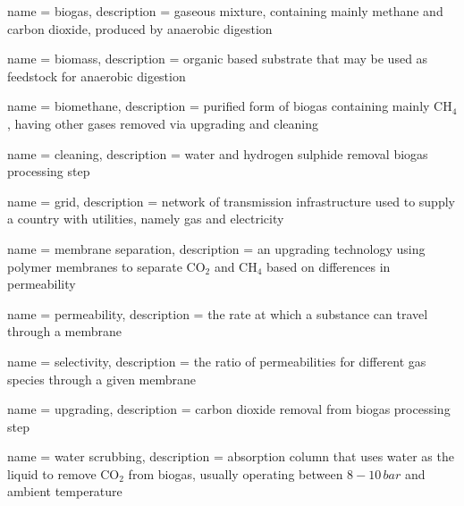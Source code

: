 
				{
				name = biogas,
				description = {gaseous mixture, containing mainly methane and carbon dioxide, produced by anaerobic digestion}
				}

				{
				name = biomass,
				description = {organic based substrate that may be used as feedstock for anaerobic digestion}
				}

				{
				name = biomethane,
				description = {purified form of biogas containing mainly CH$_4$, having other gases removed via upgrading and cleaning}
				}

				{
				name = cleaning,
				description = {water and hydrogen sulphide removal biogas processing step}
				}

				{
				name = grid,
				description = {network of transmission infrastructure used to supply a country with utilities, namely gas and electricity}
				}
				
				{
				name = membrane separation,
				description = {an upgrading technology using polymer membranes to separate CO$_2$ and CH$_4$ based on differences in permeability}
				}
				
				{
				name = permeability,
				description = {the rate at which a substance can travel through a membrane}
				}

				{
				name = selectivity,
				description = {the ratio of permeabilities for different gas species through a given membrane}
				}
				
				{
				name = upgrading,
				description = {carbon dioxide removal from biogas processing step}
				}

				{
				name = water scrubbing,
				description = {absorption column that uses water as the liquid to remove CO$_2$ from biogas, usually operating between $8-10 \, bar$ and ambient temperature}
				}





